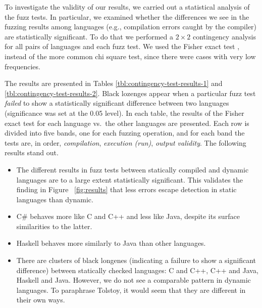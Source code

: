 \documentclass[10pt]{sigplanconf}
\begin{document}
To investigate the validity of our results, we carried out a
statistical analysis of the fuzz tests. In particular, we examined
whether the differences we see in the fuzzing results among languages
(e.g., compilation errors caught by the compiler) are statistically
significant. To do that we performed a $2\times 2$ contingency
analysis for all pairs of languages and each fuzz test. We used the
Fisher exact test \cite{Fis35},
instead of the more common chi square test,
since there were cases with very low frequencies.

The results are presented in Tables \ref{tbl:contingency-test-results-1} 
and \ref{tbl:contingency-test-results-2}. 
Black lozenges appear when a
particular fuzz test \emph{failed} to show a statistically significant
difference between two languages (significance was set at the 0.05
level). In each table, the results of the Fisher exact test for each
language vs.\ the other languages are presented.
Each row is divided into five bands, one for each fuzzing operation,
and for each band the tests are, in order, {\em compilation},
{\em execution (run)}, {\em output validity}.
The following results stand out.
\begin{itemize}
\item
The different results in fuzz tests between statically compiled and
dynamic languages are to a large extent statistically significant.
This validates the finding in Figure ~\ref{fig:results}
that less errors escape detection in static languages than dynamic.

\item C\# behaves more like C and C++ and less like Java, despite its
  surface similarities to the latter.

\item Haskell behaves more similarly to Java than other languages.

\item There are clusters of black longenes
(indicating a failure to show a significant difference)
between statically checked languages:
C and C++,
C++ and Java,
Haskell and Java.
However,
  we do not see a comparable pattern in dynamic languages.
  To paraphrase Tolstoy, it would seem that they are different in
  their own ways.
\end{itemize}
\end{document}
